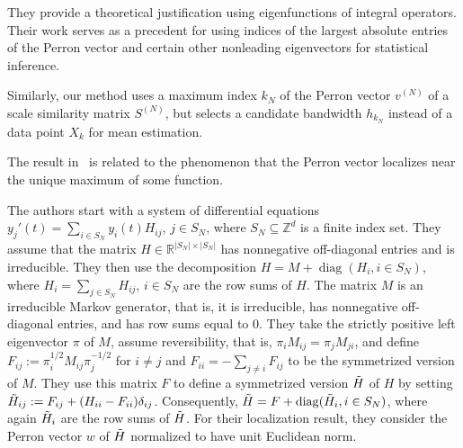 They provide a theoretical justification using eigenfunctions of integral operators. Their work serves as a precedent for using indices of the largest absolute entries of the Perron vector and certain other nonleading eigenvectors for statistical inference.

Similarly, our method uses a maximum index $k_N$ of the Perron vector $v^{(N)}$ of a scale similarity matrix $S^{(N)}$, but selects a candidate bandwidth $h_{k_N}$ instead of a data point $X_k$ for mean estimation.


The result in~\cite[Theorem~2]{baake_asymptotic_2005} is related to the phenomenon that the Perron vector localizes near the unique maximum of some function.

The authors start with a system of differential equations $y_j'(t)=\sum_{i\in S_N}y_i(t)H_{ij}$, $j\in S_N$, where $S_N\subseteq\mathbb{Z}^{d}$ is a finite index set. They assume that the matrix $H\in\mathbb{R}^{|S_N|\times|S_N|}$ has nonnegative off-diagonal entries and is irreducible. They then use the decomposition $H=M+\operatorname{diag}(H_i,i\in S_N)$, where $H_i=\sum_{j\in S_N}H_{ij}$, $i\in S_N$ are the row sums of $H$. The matrix $M$ is an irreducible Markov generator, that is, it is irreducible, has nonnegative off-diagonal entries, and has row sums equal to $0$. They take the strictly positive left eigenvector $\pi$ of $M$, assume reversibility, that is, $\pi_iM_{ij}=\pi_jM_{ji}$, and define $F_{ij}:=\pi_i^{1/2}M_{ij}\pi_j^{-1/2}$ for $i\ne j$ and $F_{ii}=-\sum_{j\ne i}F_{ij}$ to be the symmetrized version of $M$. They use this matrix $F$ to define a symmetrized version $\Tilde{H}$ of $H$ by setting $\Tilde{H}_{ij}:=F_{ij}+(H_{ii}-F_{ii})\delta_{ij}$. Consequently, $\Tilde{H}=F+\operatorname{diag}(\Tilde{H}_i,i\in S_N)$, where again $\Tilde{H}_i$ are the row sums of $\Tilde{H}$. For their localization result, they consider the Perron vector $w$ of $\Tilde{H}$ normalized to have unit Euclidean norm.

